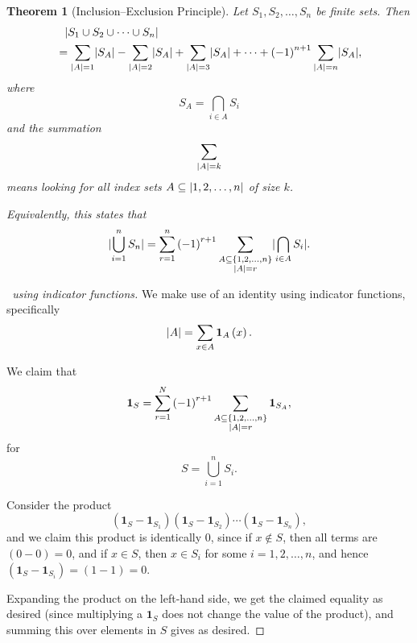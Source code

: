 \documentclass{article}
\newtheorem{theorem}{Theorem}[section]
\theoremstyle{definition}
\theoremstyle{remark}
\DeclarePairedDelimiter{\abs}{\lvert}{\rvert}
\newcommand{\pqty}[1]{\left(#1\right)}
\newcommand{\Bqty}[1]{\left\{#1\right\}}
\newcommand{\indicator}{\mathbf{1}}
\begin{document}
\begin{theorem}[Inclusion--Exclusion Principle]
    Let \(S_1, S_2, \ldots, S_n\) be finite sets. Then
    \begin{align*}
        &\phantom{=} \abs{S_1 \cup S_2 \cup \cdots \cup S_n} \\
        &= \sum_{\abs{A} = 1} \abs{S_A} - \sum_{\abs{A} = 2} \abs{S_A} + \sum_{\abs{A} = 3} \abs{S_A} + \cdots + \pqty{-1}^{n + 1} \sum_{\abs{A} = n} \abs{S_A},
    \end{align*}
    where
    \[
        S_A = \bigcap_{i \in A} S_i
    \]
    and the summation
    \[
        \sum_{\abs{A} = k}
    \]
    means looking for all index sets \(A \subseteq \abs{1, 2, \ldots, n}\) of size \(k\).

    Equivalently, this states that
    \[
        \abs{\bigcup_{i = 1}^{n} S_n} = \sum_{r = 1}^{n} \pqty{-1}^{r + 1} \sum_{\substack{A \subseteq \Bqty{1, 2, \ldots, n} \\ \abs{A} = r}} \abs{\bigcap_{i \in A} S_i}.
    \]
\end{theorem}

\begin{proof}[\proofname\ using indicator functions]
    We make use of an identity using indicator functions, specifically
    \[
        \abs{A} = \sum_{x \in A} \indicator_{A} \pqty{x}.
    \]

    We claim that
    \[
        \indicator_{S} = \sum_{r = 1}^{N} \pqty{-1}^{r + 1} \sum_{\substack{A \subseteq \Bqty{1, 2, \ldots, n} \\ \abs{A} = r}} \indicator_{S_A},
    \]
    for
    \[
        S = \bigcup_{i = 1}^{n} S_i.
    \]

    Consider the product
    \[
        \pqty{\indicator_{S} - \indicator_{S_1}} \pqty{\indicator_{S} - \indicator_{S_2}} \cdots \pqty{\indicator_{S} - \indicator_{S_n}},
    \]
    and we claim this product is identically \(0\), since if \(x \notin S\), then all terms are \(\pqty{0 - 0} = 0\), and if \(x \in S\), then \(x \in S_i\) for some \(i = 1, 2, \ldots, n\), and hence \(\pqty{\indicator_{S} - \indicator_{S_i}} = \pqty{1 - 1} = 0\).

    Expanding the product on the left-hand side, we get the claimed equality as desired (since multiplying a \(\indicator_S\) does not change the value of the product), and summing this over elements in \(S\) gives as desired.
\end{proof}
\end{document}
